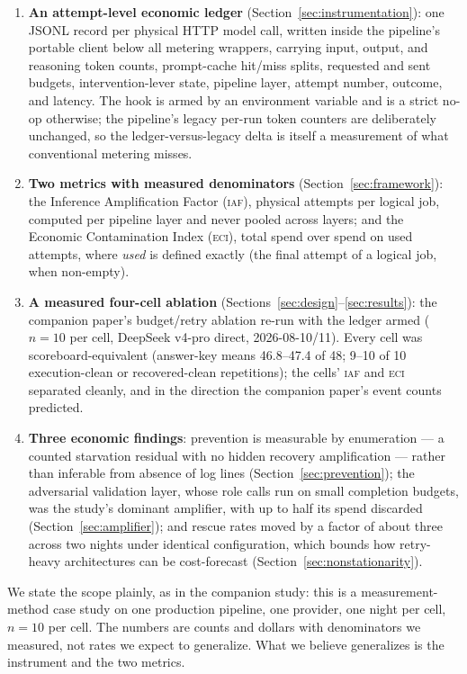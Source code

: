 \documentclass[11pt]{article}
\newcommand{\iaf}{\textsc{iaf}}
\newcommand{\eci}{\textsc{eci}}
\begin{document}
\begin{enumerate}
\item \textbf{An attempt-level economic ledger} (Section~\ref{sec:instrumentation}):
one JSONL record per physical HTTP model call, written inside the
pipeline's portable client below all metering wrappers, carrying input,
output, and reasoning token counts, prompt-cache hit/miss splits,
requested and sent budgets, intervention-lever state, pipeline layer,
attempt number, outcome, and latency. The hook is armed by an
environment variable and is a strict no-op otherwise; the pipeline's
legacy per-run token counters are deliberately unchanged, so the
ledger-versus-legacy delta is itself a measurement of what conventional
metering misses.
\item \textbf{Two metrics with measured denominators}
(Section~\ref{sec:framework}): the Inference Amplification Factor
(\iaf{}), physical attempts per logical job, computed per pipeline layer
and never pooled across layers; and the Economic Contamination Index
(\eci{}), total spend over spend on used attempts, where \emph{used} is
defined exactly (the final attempt of a logical job, when non-empty).
\item \textbf{A measured four-cell ablation} (Sections~\ref{sec:design}--\ref{sec:results}):
the companion paper's budget/retry ablation re-run with the ledger armed
($n{=}10$ per cell, DeepSeek v4-pro direct, 2026-08-10/11). Every cell
was scoreboard-equivalent (answer-key means 46.8--47.4 of 48; 9--10 of
10 execution-clean or recovered-clean repetitions); the cells' \iaf{}
and \eci{} separated cleanly, and in the direction the companion
paper's event counts predicted.
\item \textbf{Three economic findings}: prevention is measurable by
enumeration --- a counted starvation residual with no hidden recovery
amplification --- rather than inferable from absence of log lines
(Section~\ref{sec:prevention}); the adversarial validation layer, whose
role calls run on small completion budgets, was the study's dominant
amplifier, with up to half its spend discarded
(Section~\ref{sec:amplifier}); and rescue rates moved by a factor of
about three across two nights under identical configuration, which
bounds how retry-heavy architectures can be cost-forecast
(Section~\ref{sec:nonstationarity}).
\end{enumerate}

We state the scope plainly, as in the companion study: this is a
measurement-method case study on one production pipeline, one provider,
one night per cell, $n{=}10$ per cell. The numbers are counts and
dollars with denominators we measured, not rates we expect to
generalize. What we believe generalizes is the instrument and the two
metrics.
\end{document}
